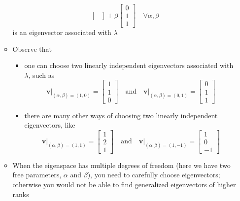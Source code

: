 \documentclass[12pt,a4paper]{article}
\begin{document}
\begin{itemize}
\begin{itemize}
\begin{equation}
\begin{bmatrix}
      \end{bmatrix}
      +
      \beta
      \begin{bmatrix}
        0 \\ 1 \\ 1
      \end{bmatrix}
      \quad \forall \alpha, \beta 
    \end{equation}
    is an eigenvector associated with $\lambda$
  \item Observe that
    \begin{itemize}
    \item one can choose two linearly independent eigenvectors associated with $\lambda$, such as
      \begin{equation}\nonumber%
        \bm{v}\big|_{(\alpha,\beta)=(1,0)}
        =
        \begin{bmatrix}
          1 \\ 1 \\ 0
        \end{bmatrix}
        \quad\text{and}\quad
        \bm{v}\big|_{(\alpha,\beta)=(0,1)}
        =
        \begin{bmatrix}
          0 \\ 1 \\ 1
        \end{bmatrix}
      \end{equation}
    \item there are many other ways of choosing two linearly independent eigenvectors, like
      \begin{equation}\nonumber%
        \bm{v}\big|_{(\alpha,\beta)=(1,1)}
        =
        \begin{bmatrix}
          1 \\ 2 \\ 1
        \end{bmatrix}
        \quad\text{and}\quad
        \bm{v}\big|_{(\alpha,\beta)=(1,-1)}
        =
        \begin{bmatrix}
          1 \\ 0 \\ -1
        \end{bmatrix}
      \end{equation}
    \end{itemize}
  \item When the eigenspace has multiple degrees of freedom (here we have two free parameters, $\alpha$ and $\beta$),
    you need to carefully choose eigenvectors; otherwise you would not be able to find generalized eigenvectors of higher ranks

\end{itemize}
\end{itemize}
\end{document}
